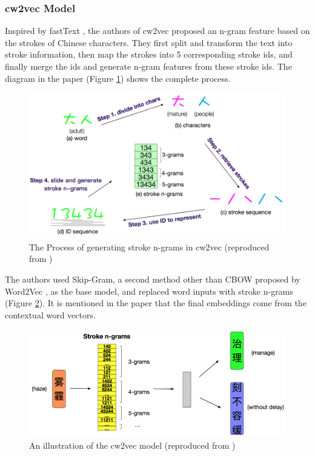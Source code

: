 \subsubsection{cw2vec Model}

Inspired by fastText \cite{bojanowski2017enriching}, the authors of cw2vec \cite{cao2018cw2vec} proposed an n-gram feature based on the strokes of Chinese characters. They first split and transform the text into stroke information, then map the strokes into 5 corresponding stroke ids, and finally merge the ids and generate n-gram features from these stroke ids. The diagram in the paper (Figure \ref{fig:cw2vec1}) shows the complete process.

\begin{figure}[h]
	\centering
	\includegraphics[scale=0.6]{../images/cw2vec_illustration1.png}
	\caption{The Process of generating stroke n-grams in cw2vec (reproduced from \cite{cao2018cw2vec})}
	\label{fig:cw2vec1}
\end{figure}

The authors used Skip-Gram, a second method other than CBOW proposed by Word2Vec \cite{mikolov2013efficient}, as the base model, and replaced word inputs with stroke n-grams (Figure \ref{fig:cw2vec2}). It is mentioned in the paper that the final embeddings come from the contextual word vectors.

\begin{figure}[h]
	\centering
	\includegraphics[scale=0.6]{../images/cw2vec_illustration2.png}
	\caption{An illustration of the cw2vec model (reproduced from \cite{cao2018cw2vec})}
	\label{fig:cw2vec2}
\end{figure}

